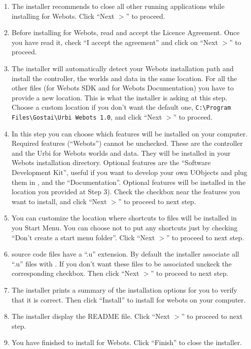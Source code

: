 \begin{enumerate}
\item The installer recommends to close all other running applications
  while installing \urbi for Webots. Click ``Next $>$'' to proceed.

\item Before installing \urbi for Webots, read and accept the Licence
  Agreement. Once you have read it, check ``I accept the agreement'' and
  click on ``Next $>$'' to proceed.

\item The installer will automatically detect your Webots installation
  path and install the \urbi controller, the worlds and data in the
  same location. For all the other files (\urbi for Webots SDK and
  \urbi for Webots Documentation) you have to provide a new
  location. This is what the installer is asking at this step. Choose
  a custom location if you don't want the default one,
  \verb+C:\Program Files\Gostai\Urbi Webots 1.0+, and click
  ``Next $>$'' to proceed.

\item In this step you can choose which features will be installed on
  your computer. Required features (``\urbi Webots'') cannot be
  unchecked. These are the \urbi controller and the Urbi for Webots
  worlds and data. They will be installed in your Webots installation
  directory. Optional features are the ``\urbi Software Development
  Kit'', useful if you want to develop your own UObjects and plug them
  in \urbi, and the ``\urbi Documentation''. Optional features will be
  installed in the location you provided at Step 3).  Check the
  checkbox near the features you want to install, and click ``Next $>$''
  to proceed to next step.

\item You can customize the location where shortcuts to \urbi files
  will be installed in you Start Menu. You can choose not to put any
  shortcuts just by checking ``Don't create a start menu folder''. Click
  ``Next $>$'' to proceed to next step.

\item \urbi source code files have a ``.u'' extension. By default the
  installer associate all ``.u'' files with \urbi. If you don't want
  these files to be associated unckeck the corresponding
  checkbox. Then click ``Next $>$'' to proceed to next step.

\item The installer prints a summary of the installation options for
  you to verify that it is correct. Then click ``Install'' to install
  \urbi for webots on your computer.

\item The installer display the README file. Click ``Next $>$'' to
  proceed to next step.

\item You have finished to install \urbi for Webots. Click ``Finish'' to
  close the installer.
\end{enumerate}


